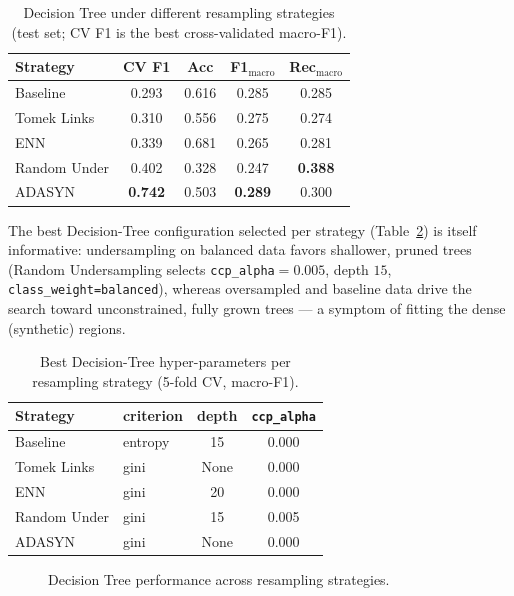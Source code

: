 \begin{table}[H]
\centering
\small
\caption{Decision Tree under different resampling strategies (test set; CV F1 is the best cross-validated macro-F1).}
\label{tab:cmi_imbalance}
\begin{tabular}{l c c c c}
\hline
Strategy & CV F1 & Acc & F1$_{\text{macro}}$ & Rec$_{\text{macro}}$ \\
\hline
Baseline       & 0.293 & 0.616 & 0.285 & 0.285 \\
Tomek Links    & 0.310 & 0.556 & 0.275 & 0.274 \\
ENN            & 0.339 & 0.681 & 0.265 & 0.281 \\
Random Under   & 0.402 & 0.328 & 0.247 & \textbf{0.388} \\
ADASYN         & \textbf{0.742} & 0.503 & \textbf{0.289} & 0.300 \\
\hline
\end{tabular}
\end{table}

The best Decision-Tree configuration selected per strategy (Table~\ref{tab:cmi_imbalance_params}) is itself informative: undersampling on balanced data favors shallower, pruned trees (Random Undersampling selects \texttt{ccp\_alpha}$=0.005$, depth $15$, \texttt{class\_weight=balanced}), whereas oversampled and baseline data drive the search toward unconstrained, fully grown trees --- a symptom of fitting the dense (synthetic) regions.

\begin{table}[H]
\centering
\small
\caption{Best Decision-Tree hyper-parameters per resampling strategy (5-fold CV, macro-F1).}
\label{tab:cmi_imbalance_params}
\begin{tabular}{l l c c}
\hline
Strategy & criterion & depth & \texttt{ccp\_alpha} \\
\hline
Baseline     & entropy & 15   & 0.000 \\
Tomek Links  & gini    & None & 0.000 \\
ENN          & gini    & 20   & 0.000 \\
Random Under & gini    & 15   & 0.005 \\
ADASYN       & gini    & None & 0.000 \\
\hline
\end{tabular}
\end{table}

\begin{figure}[h]
    \centering
    \caption{Decision Tree performance across resampling strategies.}
    \label{fig:cmi_imbalance_perf}
\end{figure}

